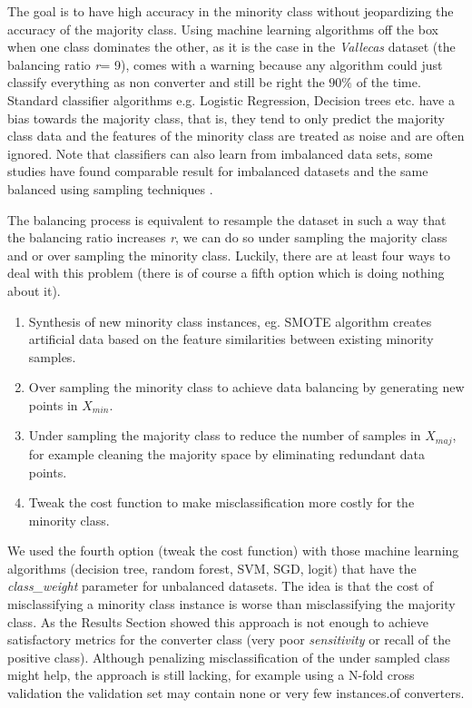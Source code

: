 \documentclass[11pt]{article}
\theoremstyle{definition}
\theoremstyle{remark}
\begin{document}
The goal is to have high accuracy in the minority class without jeopardizing the accuracy of the majority class. Using machine learning algorithms off the box when one class dominates the other, as it is the case in the \emph{Vallecas} dataset (the balancing ratio \emph{r}= 9), comes with a warning because any algorithm could just classify everything as non converter and still be right the $90\%$ of the time. Standard classifier algorithms e.g. Logistic Regression, Decision trees etc. have a bias towards the majority class, that is, they tend to only predict the majority class data and the features of the minority class are treated as noise and are often ignored. Note that classifiers can also learn from imbalanced data sets, some studies have found comparable result for imbalanced datasets and the same balanced using sampling techniques \cite{japkowicz2002class}.

The balancing process is equivalent to resample the dataset in such a way that the balancing ratio increases \emph{r}, we can do so under sampling the majority class and or over sampling the minority class. Luckily, there are at least four ways to deal with this problem (there is of course a fifth option which is doing nothing about it). 
\begin{enumerate}
	\item Synthesis of new minority class instances, eg. SMOTE algorithm creates artificial data based on the feature similarities between existing minority samples. %
	\item Over sampling the minority class to achieve data balancing by generating new points in $X_{min}$.
	\item Under sampling the majority class to reduce the number of samples in $X_{maj}$, for example cleaning the majority space by eliminating redundant data points.
	\item Tweak the cost function to make misclassification more costly for the minority class.
\end{enumerate}
We used the fourth option (tweak the cost function) with those machine learning algorithms (decision tree, random forest, SVM, SGD, logit) that have the \textit{class\_weight} parameter for unbalanced datasets. The idea is that the cost of misclassifying a minority class instance is worse than misclassifying the majority class. 
As the Results Section showed this approach is not enough to achieve satisfactory metrics for the converter class (very poor \emph{sensitivity} or recall of the positive class). Although penalizing misclassification of the under sampled class might help, the approach is still lacking, for example using a N-fold cross validation the validation set may contain none or very few instances.of converters.
\end{document}
